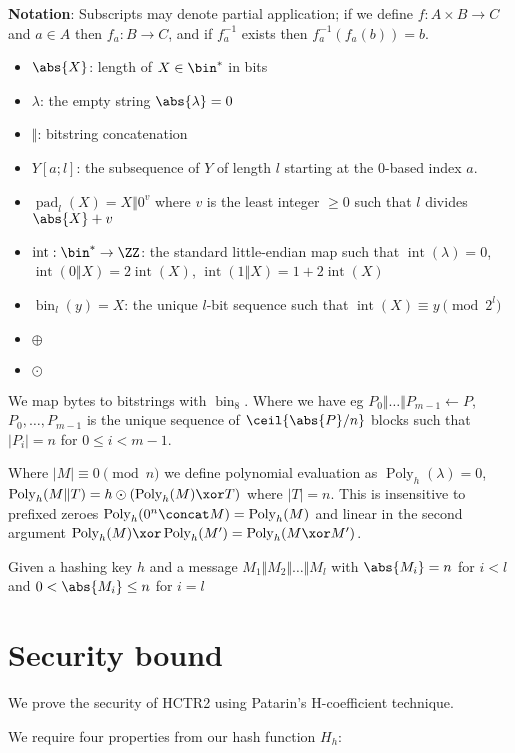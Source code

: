 \documentclass[letterpaper,11pt]{article}
\newcommand*{\parintro}[1]{\textbf{#1}:}
\newcommand*{\Concat}{\Vert}
\DeclareMathOperator{\fromint}{bin}
\DeclareMathOperator{\intify}{int}
\DeclareMathOperator{\pad}{pad}
\DeclareMathOperator{\Poly}{Poly}
\begin{document}
\parintro{Notation}
Subscripts may denote partial application; if we define $f: A \times B \rightarrow C$ and
$a \in A$ then $f_a: B \rightarrow C$, and if $f_a^{-1}$ exists then $f_a^{-1}(f_a(b)) = b$.
\begin{itemize}
    \item $\abs{X}$: length of $X \in \bin^{*}$ in bits
    \item $\lambda$: the empty string $\abs{\lambda} = 0$
    \item $\Concat$: bitstring concatenation
    \item $Y[a;l]$: the subsequence of $Y$ of length $l$ starting at the 0-based index $a$.
    \item $\pad_l(X) = X \Concat 0^v$
    where $v$ is the least integer $\geq 0$ such that $l$ divides $\abs{X} + v$
    \item $\intify: \bin^{*} \rightarrow \ZZ$: the
    standard little-endian map such that
    $\intify(\lambda) = 0$, $\intify(0 \Concat X) = 2\intify(X)$, $\intify(1 \Concat X) = 1 + 2\intify(X)$
    \item $\fromint_l(y) = X$: the unique
    $l$-bit sequence such that $\intify(X) \equiv y \pmod{2^l}$
    \item \(\oplus\)
    \item \(\odot\)
\end{itemize}
We map bytes to bitstrings with \(\fromint_8\).
Where we have eg \(P_0 \Concat \ldots \Concat P_{m-1} \gets P\), 
\(P_0, \ldots, P_{m-1}\) is the unique sequence of \(\ceil{\abs{P}/n}\) blocks
such that \(|P_i| = n\) for \(0 \leq i < m-1\).

Where \(|M| \equiv 0 \pmod n\) we define polynomial evaluation as \(\Poly_h(\lambda) = 0\), \(\Poly_h(M \Concat T) = h \odot (\Poly_h(M) \xor T)\) where \(|T| = n\). This is insensitive to prefixed zeroes \(\Poly_h(0^n \concat M) = \Poly_h(M)\) and linear in the second argument \(\Poly_h(M) \xor \Poly_h(M') = \Poly_h(M \xor M')\).

Given a hashing key \(h\) and a message \(M_1 \Concat M_2 \Concat \ldots \Concat M_l\) with \(\abs{M_i} = n\) for \(i < l\) and \(0 < \abs{M_i} \leq n\) for \(i = l\)

\section{Security bound}

We prove the security of HCTR2 using Patarin's H-coefficient technique. 

We require four properties from our hash function \(H_h\):

\printbibliography[heading=bibintoc]
\end{document}
